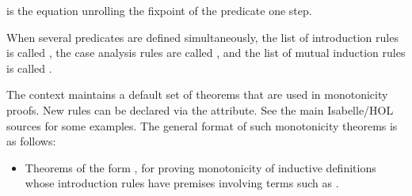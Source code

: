 \begin{isabellebody}
\begin{isamarkuptext}
\begin{description}
  \item {} is the equation unrolling the fixpoint of the
  predicate one step.
 
  \end{description}

  When several predicates  are
  defined simultaneously, the list of introduction rules is called
  , the case analysis rules are
  called , and the list
  of mutual induction rules is called .%
\end{isamarkuptext}%
\isamarkuptrue%
%
\isamarkuptrue%
%
\begin{isamarkuptext}%
The context maintains a default set of theorems that are used
  in monotonicity proofs.  New rules can be declared via the
  \hyperlink{attribute.HOL.mono}{\mbox{}} attribute.  See the main Isabelle/HOL
  sources for some examples.  The general format of such monotonicity
  theorems is as follows:

  \begin{itemize}

  \item Theorems of the form , for proving
  monotonicity of inductive definitions whose introduction rules have
  premises involving terms such as .


\end{itemize}
\end{isamarkuptext}
\end{isabellebody}
